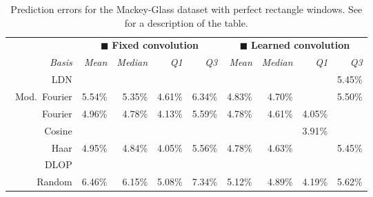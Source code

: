 \begin{table}[p]
	\caption[Prediction errors for the Mackey-Glass dataset with perfect rectangle windows]{Prediction errors for the Mackey-Glass dataset with perfect rectangle windows. See  for a description of the table.}
	\label{tbl:mackey_glass_results_ne}
	\centering\small\sffamily
	\setlength{\tabcolsep}{8.75pt}
	\begin{tabular}{r  r r r r  r r r r}
	\toprule
	& \multicolumn{4}{c}{{\color{skyblue1}$\blacksquare$} \textbf{Fixed convolution}}
	& \multicolumn{4}{c}{{\color{aluminium2}$\blacksquare$} \textbf{Learned convolution}} \\
	\cmidrule(r){2-5}\cmidrule(l){6-9}
	\emph{Basis} &
	\emph{Mean} &
	\emph{Median} &
	\emph{Q1} &
	\emph{Q3} &
	\emph{Mean} &
	\emph{Median} &
	\emph{Q1} &
	\emph{Q3} \\
	\midrule
	\symLTI~LDN &
	 \cellcolor{CornflowerBlue!25}{4.80\%} &
	 \cellcolor{CornflowerBlue!25}{4.60\%} &
	 \cellcolor{CornflowerBlue!25}{4.03\%} &
	 \cellcolor{CornflowerBlue!50}{5.35\%} &
	 \cellcolor{CornflowerBlue!25}{4.69\%} &
	 \cellcolor{CornflowerBlue!75}{4.41\%} &
	 \cellcolor{CornflowerBlue!25}{3.84\%} &
	5.45\% \\
	\symLTI~Mod.~Fourier &
	5.54\% &
	5.35\% &
	4.61\% &
	6.34\% &
	4.83\% &
	4.70\% &
	 \cellcolor{CornflowerBlue!50}{3.82\%} &
	5.50\% \\
	\symSDT~Fourier &
	4.96\% &
	4.78\% &
	4.13\% &
	5.59\% &
	4.78\% &
	4.61\% &
	4.05\% &
	 \cellcolor{CornflowerBlue!25}{5.44\%} \\
	\symSDT~Cosine &
	 \cellcolor{CornflowerBlue!75}{4.68\%} &
	 \cellcolor{CornflowerBlue!50}{4.53\%} &
	 \cellcolor{CornflowerBlue!75}{3.84\%} &
	 \cellcolor{CornflowerBlue!75}{5.19\%} &
	 \cellcolor{CornflowerBlue!75}{4.68\%} &
	 \cellcolor{CornflowerBlue!25}{4.48\%} &
	3.91\% &
	 \cellcolor{CornflowerBlue!50}{5.28\%} \\
	\symSDT~Haar &
	4.95\% &
	4.84\% &
	4.05\% &
	5.56\% &
	4.78\% &
	4.63\% &
	 \cellcolor{CornflowerBlue!25}{3.84\%} &
	5.45\% \\
	\symFIR~DLOP &
	 \cellcolor{CornflowerBlue!50}{4.79\%} &
	 \cellcolor{CornflowerBlue!75}{4.52\%} &
	 \cellcolor{CornflowerBlue!50}{3.88\%} &
	 \cellcolor{CornflowerBlue!25}{5.50\%} &
	 \cellcolor{CornflowerBlue!75}{4.68\%} &
	 \cellcolor{CornflowerBlue!50}{4.42\%} &
	 \cellcolor{CornflowerBlue!75}{3.78\%} &
	 \cellcolor{CornflowerBlue!75}{5.23\%} \\
	\symFIR~Random &
	6.46\% &
	6.15\% &
	5.08\% &
	7.34\% &
	5.12\% &
	4.89\% &
	4.19\% &
	5.62\% \\
	\bottomrule
	\end{tabular}
\end{table}

